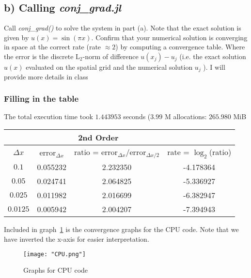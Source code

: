 \documentclass{article}
\begin{document}
\subsection{b) Calling \textit{conj\_grad.jl}}

 Call \textit{conj\_grad()} to solve the system in part (a). Note that the exact
 solution is given by $u(x) = \sin(\pi x)$.  Confirm that your numerical
 solution is converging in space at the correct rate (rate $\approx 2$) by
 computing a convergence table.  Where the error is the discrete L$_2$-norm of
 difference $u(x_j) - u_j$ (i.e. the exact solution $u(x)$ evaluated on the spatial
 grid and the numerical solution $u_j$ ). I will provide more details in class

\subsubsection{Filling in the table}
The total execution time took $1.443953$ seconds ($3.99$ M allocations:
$265.980$ MiB

\begin{table}[h]
  \begin{center}
    \begin{tabular}{cccc}
      \toprule
      \multicolumn{1}{c}{} &  \multicolumn{2}{c}{2nd Order}  \\
      \midrule
      $\Delta x$&  \hspace{3mm} error$_{\Delta x}$ &\hspace{3mm} ratio = error$_{\Delta x}$/error$_{\Delta x/2}$ \hspace{3mm} &\hspace{3mm} rate = $\log_{2}$(ratio)   \\
      $0.1$    & 0.055232 & 2.232350 & -4.178364 \\
      $0.05 $  & 0.024741 & 2.064825 & -5.336927 \\
      $0.025$  & 0.011982 & 2.016699 & -6.382947 \\
      $0.0125$ & 0.005942 & 2.004207 & -7.394943 \\
      \bottomrule
    \end{tabular}
  \end{center}
\end{table}

Included in graph~\ref{fig:cpu} is the convergence graphs for the CPU code. Note
that we have inverted the x-axis for easier interpretation.
\begin{figure}
    \texttt{[image: "CPU.png"]}
    \caption{Graphs for CPU code}
    \label{fig:cpu}
\end{figure}
\end{document}
